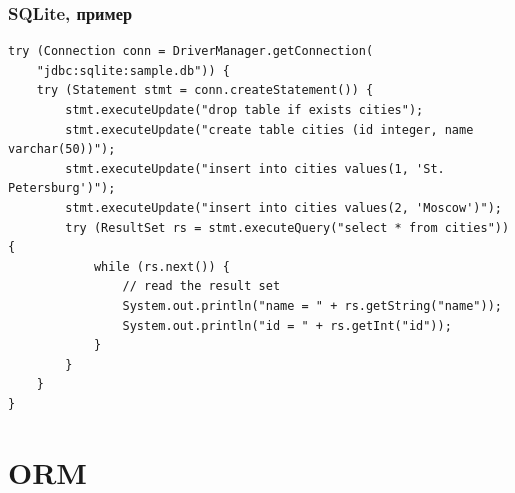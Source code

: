 \documentclass[xetex,mathserif,serif]{beamer}
\begin{document}
	\begin{frame}[fragile]
		\frametitle{SQLite, пример}
		\begin{footnotesize}
			\begin{verbatim}
try (Connection conn = DriverManager.getConnection(
    "jdbc:sqlite:sample.db")) {
    try (Statement stmt = conn.createStatement()) {
        stmt.executeUpdate("drop table if exists cities");
        stmt.executeUpdate("create table cities (id integer, name varchar(50))");
        stmt.executeUpdate("insert into cities values(1, 'St. Petersburg')");
        stmt.executeUpdate("insert into cities values(2, 'Moscow')");
        try (ResultSet rs = stmt.executeQuery("select * from cities")) {
            while (rs.next()) {
                // read the result set
                System.out.println("name = " + rs.getString("name"));
                System.out.println("id = " + rs.getInt("id"));
            }
        }
    }
}
			\end{verbatim}
		\end{footnotesize}
	\end{frame}

	\section{ORM}
\end{document}
